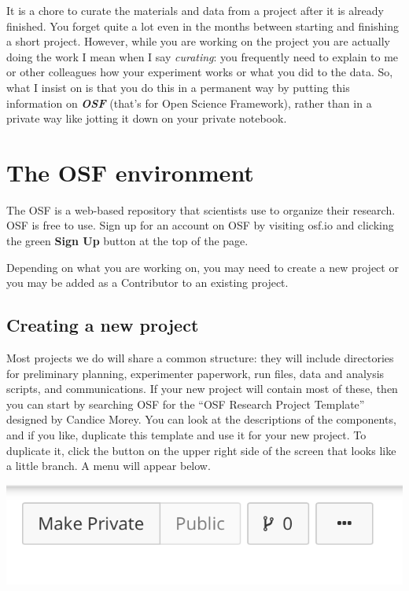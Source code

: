 \documentclass[12pt,]{book}
\theoremstyle{definition}
\theoremstyle{definition}
\theoremstyle{definition}
\theoremstyle{remark}
\begin{document}
It is a chore to curate the materials and data from a project after it
is already finished. You forget quite a lot even in the months between
starting and finishing a short project. However, while you are working
on the project you are actually doing the work I mean when I say
\emph{curating}: you frequently need to explain to me or other
colleagues how your experiment works or what you did to the data. So,
what I insist on is that you do this in a permanent way by putting this
information on \textbf{\emph{OSF}} (that's for Open Science Framework),
rather than in a private way like jotting it down on your private
notebook.

\section{The OSF environment}\label{the-osf-environment}

The OSF is a web-based repository that scientists use to organize their
research. OSF is free to use. Sign up for an account on OSF by visiting
osf.io and clicking the green \textbf{Sign Up} button at the top of the
page.

Depending on what you are working on, you may need to create a new
project or you may be added as a Contributor to an existing project.

\subsection{Creating a new project}\label{creating-a-new-project}

Most projects we do will share a common structure: they will include
directories for preliminary planning, experimenter paperwork, run files,
data and analysis scripts, and communications. If your new project will
contain most of these, then you can start by searching OSF for the ``OSF
Research Project Template'' designed by Candice Morey. You can look at
the descriptions of the components, and if you like, duplicate this
template and use it for your new project. To duplicate it, click the
button on the upper right side of the screen that looks like a little
branch. A menu will appear below.

\includegraphics{osf_fork.png}
\end{document}
